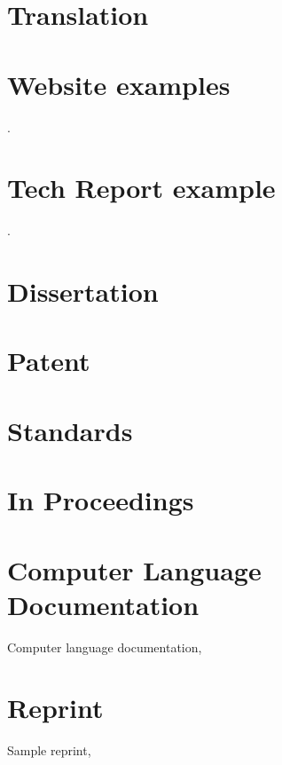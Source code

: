 \documentclass[preprint]{JASA}
\begin{document}
\citep[in press]{inpress3}


\section*{Translation}

\citep{translation}


\section*{Website examples}

\citep{websiteauthyear}.

\section*{Tech Report example}

\citep{samptechreport6}.

\section*{Dissertation}
\citep{sampthesis}


\section*{Patent}

\citep{samppatent2}

\section*{Standards}

\citep{amstand,ansi}

\section*{In Proceedings}

\citep{sampinproceedings3}

\section*{Computer Language Documentation}
Computer language documentation, 

\citep{sampcode2}


\section*{Reprint}
Sample reprint, 
\citep{sampReprint}
\end{document}
